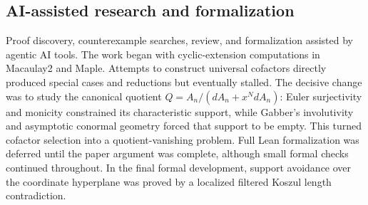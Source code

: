 \documentclass[11pt]{amsart}
\numberwithin{equation}{section}
\theoremstyle{plain}
\theoremstyle{remark}
\begin{document}
\clearpage
































\begin{appendix}


\section{AI-assisted research and formalization}\label{app:ai-workflow}

Proof discovery, counterexample searches, review, and formalization 
assisted by agentic AI tools. The work began with
cyclic-extension computations in Macaulay2 and Maple. Attempts to construct
universal cofactors directly produced special cases and reductions but
eventually stalled. The decisive change was to study the canonical quotient
$Q=A_n/(dA_n+x^N dA_n)$: Euler surjectivity and monicity constrained its
characteristic support, while Gabber's involutivity and asymptotic conormal
geometry forced that support to be empty. This turned cofactor selection
into a quotient-vanishing problem. Full Lean formalization was deferred
until the paper argument was complete, although small formal checks
continued throughout. In the final formal development, support avoidance
over the coordinate hyperplane was proved by a localized filtered Koszul
length contradiction.


\end{appendix}
\end{document}
